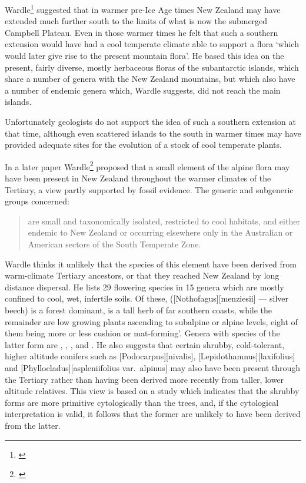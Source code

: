 Wardle\footnote{\cite{wardle1963evolution}} suggested that in warmer pre-Ice Age times New Zealand may have extended much further south to the limits of what is now the submerged Campbell Plateau.
Even in those warmer times he felt that such a southern extension would have had a cool temperate climate able to support a flora `which would later give rise to the present mountain flora'.
He based this idea on the present, fairly diverse, mostly herbaceous floras of the subantarctic islands, which share a number of genera with the New Zealand mountains, but which also have a number of endemic genera which, Wardle suggests, did not reach the main islands.

Unfortunately geologists do not support the idea of such a southern extension at that time, although even scattered islands to the south in warmer times may have provided adequate sites for the evolution of a stock of cool temperate plants.

In a later paper Wardle\footnote{\cite{wardle1968evidence}} proposed that a small element of the alpine flora may have been present in New Zealand throughout the warmer climates of the Tertiary, a view partly supported by fossil evidence.
The generic and subgeneric groups concerned:

\begin{quote}
	are small and taxonomically isolated, restricted to cool habitats, and either endemic to New Zealand or occurring elsewhere only in the Australian or American sectors of the South Temperate Zone.
\end{quote}

Wardle thinks it unlikely that the species of this element have been derived from warm-climate Tertiary ancestors, or that they reached New Zealand by long distance dispersal.
He lists 29 flowering species in 15 genera which are mostly confined to cool, wet, infertile soils.
Of these,  ([Nothofagus][menziesii] --- silver beech) is a forest dominant,  is a tall herb of far southern coasts, while the remainder are low growing plants ascending to subalpine or alpine levels, eight of them being more or less cushion or mat-forming'.
Genera with species of the latter form are , , ,  and .
He also suggests that certain shrubby, cold-tolerant, higher altitude conifers such as [Podocarpus][nivalis], [Lepidothamnus][laxifolius] and [Phyllocladus][aspleniifolius var.\ alpinus] may also have been present through the Tertiary rather than having been derived more recently from taller, lower altitude relatives.
This view is based on a study which indicates that the shrubby forms are more primitive cytologically than the trees, and, if the cytological interpretation is valid, it follows that the former are unlikely to have been derived from the latter.

